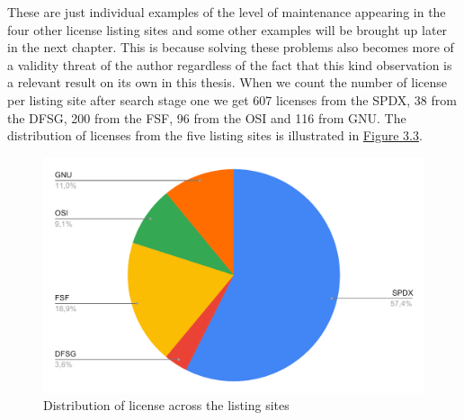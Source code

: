 These are just individual examples of the level of maintenance appearing in the four other license listing sites and some other examples will be brought up later in the next chapter. This is because solving these problems also becomes more of a validity threat of the author regardless of the fact that this kind observation is a relevant result on its own in this thesis. When we count the number of license per listing site after search stage one we get 607 licenses from the SPDX, 38 from the DFSG, 200 from the FSF, 96 from the OSI and 116 from GNU. The distribution of licenses from the five listing sites is illustrated in \hyperref[fig:3-3]{Figure 3.3}.
\begin{figure}
	\centering
	\includegraphics[scale=0.76]{figures/figure-3-3.pdf}
	\caption{Distribution of license across the listing sites}
	\label{fig:3-3}
\end{figure}
